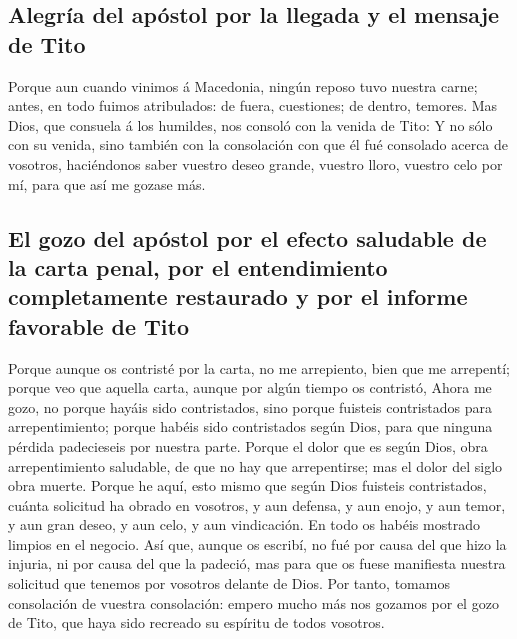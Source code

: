 \hypertarget{alegruxeda-del-apuxf3stol-por-la-llegada-y-el-mensaje-de-tito}{%
\subsection{Alegría del apóstol por la llegada y el mensaje de
Tito}\label{alegruxeda-del-apuxf3stol-por-la-llegada-y-el-mensaje-de-tito}}

 Porque aun cuando vinimos á Macedonia, ningún reposo tuvo
nuestra carne; antes, en todo fuimos atribulados: de fuera, cuestiones;
de dentro, temores.  Mas Dios, que consuela á los humildes,
nos consoló con la venida de Tito:  Y no sólo con su venida,
sino también con la consolación con que él fué consolado acerca de
vosotros, haciéndonos saber vuestro deseo grande, vuestro lloro, vuestro
celo por mí, para que así me gozase más.

\hypertarget{el-gozo-del-apuxf3stol-por-el-efecto-saludable-de-la-carta-penal-por-el-entendimiento-completamente-restaurado-y-por-el-informe-favorable-de-tito}{%
\subsection{El gozo del apóstol por el efecto saludable de la carta
penal, por el entendimiento completamente restaurado y por el informe
favorable de
Tito}\label{el-gozo-del-apuxf3stol-por-el-efecto-saludable-de-la-carta-penal-por-el-entendimiento-completamente-restaurado-y-por-el-informe-favorable-de-tito}}

 Porque aunque os contristé por la carta, no me arrepiento,
bien que me arrepentí; porque veo que aquella carta, aunque por algún
tiempo os contristó,  Ahora me gozo, no porque hayáis sido
contristados, sino porque fuisteis contristados para arrepentimiento;
porque habéis sido contristados según Dios, para que ninguna pérdida
padecieseis por nuestra parte.  Porque el dolor que es
según Dios, obra arrepentimiento saludable, de que no hay que
arrepentirse; mas el dolor del siglo obra muerte.  Porque
he aquí, esto mismo que según Dios fuisteis contristados, cuánta
solicitud ha obrado en vosotros, y aun defensa, y aun enojo, y aun
temor, y aun gran deseo, y aun celo, y aun vindicación. En todo os
habéis mostrado limpios en el negocio.  Así que, aunque os
escribí, no fué por causa del que hizo la injuria, ni por causa del que
la padeció, mas para que os fuese manifiesta nuestra solicitud que
tenemos por vosotros delante de Dios.  Por tanto, tomamos
consolación de vuestra consolación: empero mucho más nos gozamos por el
gozo de Tito, que haya sido recreado su espíritu de todos vosotros.

